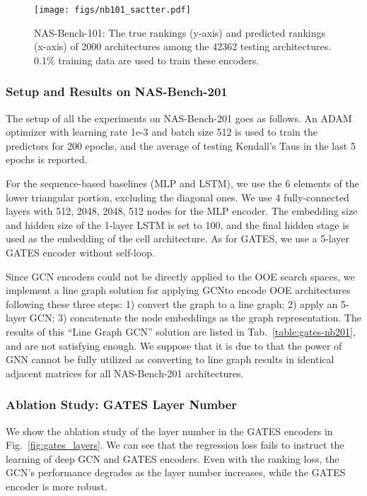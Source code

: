 \documentclass[runningheads]{llncs}
\begin{document}
\begin{figure*}[bt]
\texttt{[image: figs/nb101\_sactter.pdf]}
\caption{NAS-Bench-101: The true rankings (y-axis) and predicted rankings (x-axis) of 2000 architectures among the 42362 testing architectures. 0.1\% training data are used to train these encoders.}
\label{fig:scatter-nb101}
\end{figure*}

\subsubsection{Setup and Results on NAS-Bench-201}
The setup of all the experiments on NAS-Bench-201 goes as follows. An ADAM optimizer with learning rate 1e-3 and batch size 512 is used to train the predictors for 200 epochs, and the average of testing Kendall's Taus in the last 5 epochs is reported.

For the sequence-based baselines (MLP and LSTM), we use the 6 elements of the lower triangular portion, excluding the diagonal ones. We use 4 fully-connected layers with 512, 2048, 2048, 512 nodes for the MLP encoder. The embedding size and hidden size of the 1-layer LSTM is set to 100, and the final hidden stage is used as the embedding of the cell architecture. As for GATES, we use a 5-layer GATES encoder without self-loop.

Since GCN encoders could not be directly applied to the OOE search spaces, we implement a line graph solution for applying GCNto encode OOE architectures following these three steps: 1) convert the graph to a line graph; 2) apply an 5-layer GCN; 3) concatenate the node embeddings as the graph representation. The results of this ``Line Graph GCN'' solution are listed in Tab.~\ref{table:gates-nb201}, and are not satisfying enough. We suppose that it is due to that the power of GNN cannot be fully utilized as converting to line graph results in identical adjacent matrices for all NAS-Bench-201 architectures.


\subsubsection{Ablation Study: GATES Layer Number}
\label{sec:exp-ablation-layernum}


We show the ablation study of the layer number in the GATES encoders in Fig.~\ref{fig:gates_layers}. We can see that the regression loss fails to instruct the learning of deep GCN and GATES encoders. Even with the ranking loss, the GCN's performance degrades as the layer number increases, while the GATES encoder is more robust.
\end{document}
